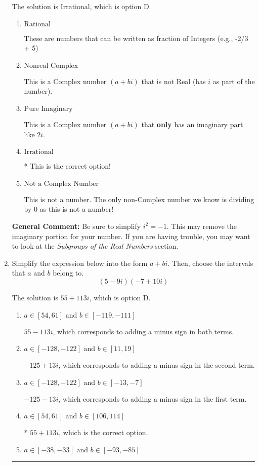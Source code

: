 \documentclass{extbook}[14pt]
\newcommand{\litem}[1]{\item #1

\rule{\textwidth}{0.4pt}}
\begin{document}
\begin{enumerate}
{The solution is \( \text{Irrational} \), which is option D.\begin{enumerate}[label=\Alph*.]
\item \( \text{Rational} \)

These are numbers that can be written as fraction of Integers (e.g., -2/3 + 5)
\item \( \text{Nonreal Complex} \)

This is a Complex number $(a+bi)$ that is not Real (has $i$ as part of the number).
\item \( \text{Pure Imaginary} \)

This is a Complex number $(a+bi)$ that \textbf{only} has an imaginary part like $2i$.
\item \( \text{Irrational} \)

* This is the correct option!
\item \( \text{Not a Complex Number} \)

This is not a number. The only non-Complex number we know is dividing by 0 as this is not a number!
\end{enumerate}

\textbf{General Comment:} Be sure to simplify $i^2 = -1$. This may remove the imaginary portion for your number. If you are having trouble, you may want to look at the \textit{Subgroups of the Real Numbers} section.
}
\litem{
Simplify the expression below into the form $a+bi$. Then, choose the intervals that $a$ and $b$ belong to.
\[ (5 - 9 i)(-7 + 10 i) \]

The solution is \( 55 + 113 i \), which is option D.\begin{enumerate}[label=\Alph*.]
\item \( a \in [54, 61] \text{ and } b \in [-119, -111] \)

 $55 - 113 i$, which corresponds to adding a minus sign in both terms.
\item \( a \in [-128, -122] \text{ and } b \in [11, 19] \)

 $-125 + 13 i$, which corresponds to adding a minus sign in the second term.
\item \( a \in [-128, -122] \text{ and } b \in [-13, -7] \)

 $-125 - 13 i$, which corresponds to adding a minus sign in the first term.
\item \( a \in [54, 61] \text{ and } b \in [106, 114] \)

* $55 + 113 i$, which is the correct option.
\item \( a \in [-38, -33] \text{ and } b \in [-93, -85] \)


\end{enumerate}}
\end{enumerate}
\end{document}
